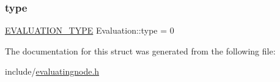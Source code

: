 \subsubsection{\texorpdfstring{type}{type}}
{\footnotesize\ttfamily \hyperlink{statics_8h_a6664c451ca7787483a7981cc1de68dbb}{E\+V\+A\+L\+U\+A\+T\+I\+O\+N\+\_\+\+T\+Y\+PE} Evaluation\+::type = 0}



The documentation for this struct was generated from the following file\+:\begin{DoxyCompactItemize}
\item 
include/\hyperlink{evaluatingnode_8h}{evaluatingnode.\+h}\end{DoxyCompactItemize}
